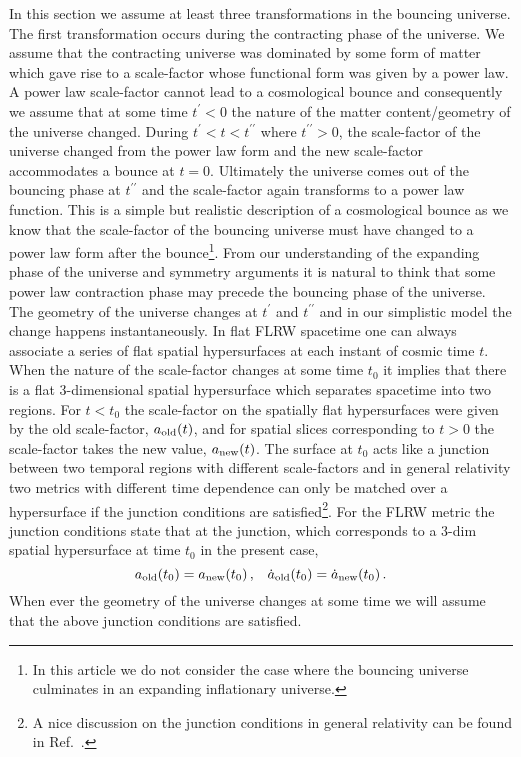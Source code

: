 \documentclass[24pt]{article}
\begin{document}
In this section we assume at least three transformations in the
bouncing universe.  The first transformation occurs during the
contracting phase of the universe. We assume that the contracting
universe was dominated by some form of matter which gave rise to a
scale-factor whose functional form was given by a power law. A power
law scale-factor cannot lead to a cosmological bounce and consequently
we assume that at some time $t^\prime < 0$ the nature of the matter
content/geometry of the universe changed. During $t^{\prime } < t <
t^{\prime \prime}$ where $t^{\prime \prime}>0$, the scale-factor of
the universe changed from the power law form and the new scale-factor
accommodates a bounce at $t=0$. Ultimately the universe comes out of
the bouncing phase at $t^{\prime \prime}$ and the scale-factor again
transforms to a power law function. This is a simple but realistic
description of a cosmological bounce as we know that the scale-factor
of the bouncing universe must have changed to a power law form after
the bounce\footnote{In this article we do not consider the case where
  the bouncing universe culminates in an expanding inflationary
  universe.}. From our understanding of the expanding phase of the
universe and symmetry arguments it is natural to think that some power
law contraction phase may precede the bouncing phase of the
universe. The geometry of the universe changes at $t^\prime$ and
$t^{\prime\prime}$ and in our simplistic model the change happens
instantaneously. In flat FLRW spacetime one can always associate a
series of flat spatial hypersurfaces at each instant of cosmic time
$t$. When the nature of the scale-factor changes at some time $t_0$ it
implies that there is a flat 3-dimensional spatial hypersurface which
separates spacetime into two regions. For $t<t_0$ the scale-factor on
the spatially flat hypersurfaces were given by the old scale-factor,
$a_{\rm old}(t)$, and for spatial slices corresponding to $t>0$ the
scale-factor takes the new value, $a_{\rm new}(t)$.  The surface at
$t_0$ acts like a junction between two temporal regions with different
scale-factors and in general relativity two metrics with different
time dependence can only be matched over a hypersurface if the
junction conditions are satisfied\footnote{A nice discussion on the
  junction conditions in general relativity can be found in
  Ref.~\cite{poisson}.}. For the FLRW metric the junction conditions
state that at the junction, which corresponds to a 3-dim spatial
hypersurface at time $t_0$ in the present case,
$$a_{\rm old}(t_0) = a_{\rm new}(t_0)\,,\,\,\,\,\,\dot{a}_{\rm
  old}(t_0) = \dot{a}_{\rm new}(t_0)\,.$$
When ever the geometry of the universe changes at some time we will assume that
the above junction conditions are satisfied.
\end{document}
